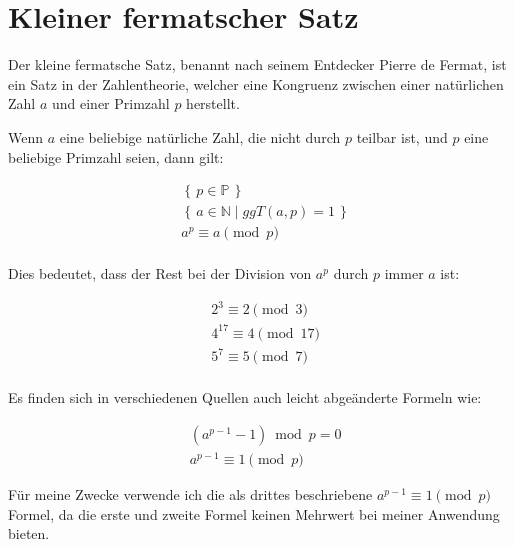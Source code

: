 \section{Kleiner fermatscher Satz}

Der kleine fermatsche Satz, benannt nach seinem Entdecker Pierre de Fermat, ist ein Satz in der Zahlentheorie, welcher eine Kongruenz zwischen einer natürlichen Zahl $a$ und einer Primzahl $p$ herstellt.\cite{wa01}

Wenn $a$ eine beliebige natürliche Zahl, die nicht durch $p$ teilbar ist, und $p$ eine beliebige Primzahl seien, dann gilt:

\begin{equation}
  \begin{split}
    &\left\{\,p \in \mathbb{P}\, \right\}\\
    &\left\{\,a \in \mathbb{N}\mid ggT(a,p) = 1\, \right\}\\
    &a^{p} \equiv a \pmod{p}\\
  \end{split}
\end{equation}

Dies bedeutet, dass der Rest bei der Division von $a^{p}$ durch $p$ immer $a$ ist:

\begin{equation}
  \begin{split}
    &2^{3} \equiv 2\pmod{3}\\
    &4^{17} \equiv 4\pmod{17}\\
    &5^{7} \equiv 5\pmod{7}\\
  \end{split}
\end{equation}

Es finden sich in verschiedenen Quellen\cite{wa01}\cite{mw01} auch leicht abgeänderte Formeln wie:

\begin{equation}
  \begin{split}
    &(a^{p-1}-1) \bmod p = 0\\
    &a^{p-1} \equiv 1\pmod{p}
  \end{split}
\end{equation}

Für meine Zwecke verwende ich die als drittes beschriebene $a^{p-1} \equiv 1\pmod{p}$ Formel, da die erste und zweite Formel keinen Mehrwert bei meiner Anwendung bieten.
